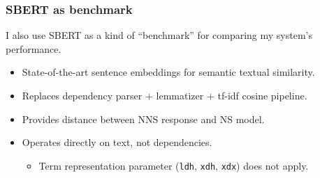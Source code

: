 \documentclass[handout,xcolor={dvipsnames}]{beamer}
\newcommand{\param}[1]{\texttt{#1}}
\begin{document}
\begin{frame}
\frametitle{SBERT as benchmark}
I also use SBERT as a kind of ``benchmark'' for comparing my system's performance.
\pause
\vspace{.3em}
\begin{itemize}
\pause
\item State-of-the-art sentence embeddings for semantic textual similarity.
\vspace{.3em}
\vspace{-1.2em}
\pause
\item Replaces dependency parser $+$ lemmatizer $+$ tf-idf cosine pipeline. 
\vspace{.3em}
\pause
\item Provides distance between NNS response and NS model.
\vspace{.3em}
\pause
\item Operates directly on text, not dependencies.
\begin{itemize}
\vspace{.3em}
\pause
\item Term representation parameter (\param{ldh}, \param{xdh}, \param{xdx}) does not apply.
\end{itemize}
\end{itemize}
\end{frame}
\end{document}
